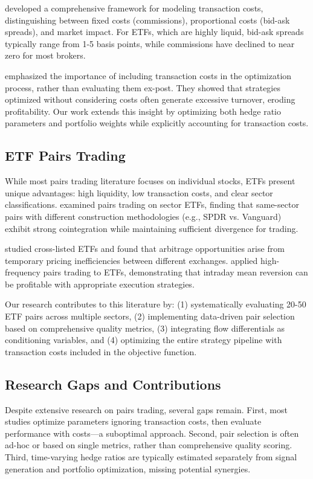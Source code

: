 \documentclass[12pt]{article}
\begin{document}
\citet{lesmond2004costs} developed a comprehensive framework for modeling transaction costs, distinguishing between fixed costs (commissions), proportional costs (bid-ask spreads), and market impact. For ETFs, which are highly liquid, bid-ask spreads typically range from 1-5 basis points, while commissions have declined to near zero for most brokers.

\citet{avellaneda2010statistical} emphasized the importance of including transaction costs in the optimization process, rather than evaluating them ex-post. They showed that strategies optimized without considering costs often generate excessive turnover, eroding profitability. Our work extends this insight by optimizing both hedge ratio parameters and portfolio weights while explicitly accounting for transaction costs.

\subsection{ETF Pairs Trading}

While most pairs trading literature focuses on individual stocks, ETFs present unique advantages: high liquidity, low transaction costs, and clear sector classifications. \citet{chen2012pairs} examined pairs trading on sector ETFs, finding that same-sector pairs with different construction methodologies (e.g., SPDR vs. Vanguard) exhibit strong cointegration while maintaining sufficient divergence for trading.

\citet{rad2016pairs} studied cross-listed ETFs and found that arbitrage opportunities arise from temporary pricing inefficiencies between different exchanges. \citet{avellaneda2010statistical} applied high-frequency pairs trading to ETFs, demonstrating that intraday mean reversion can be profitable with appropriate execution strategies.

Our research contributes to this literature by: (1) systematically evaluating 20-50 ETF pairs across multiple sectors, (2) implementing data-driven pair selection based on comprehensive quality metrics, (3) integrating flow differentials as conditioning variables, and (4) optimizing the entire strategy pipeline with transaction costs included in the objective function.

\subsection{Research Gaps and Contributions}

Despite extensive research on pairs trading, several gaps remain. First, most studies optimize parameters ignoring transaction costs, then evaluate performance with costs—a suboptimal approach. Second, pair selection is often ad-hoc or based on single metrics, rather than comprehensive quality scoring. Third, time-varying hedge ratios are typically estimated separately from signal generation and portfolio optimization, missing potential synergies.
\end{document}
